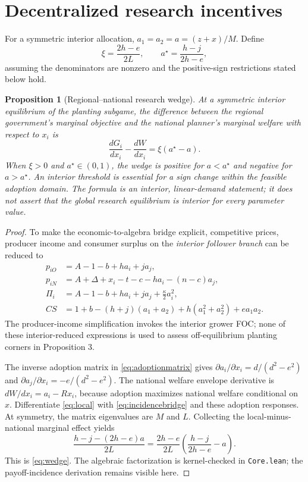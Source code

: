 \documentclass[11pt]{article}
\newtheorem{proposition}{Proposition}
\begin{document}
\section{Decentralized research incentives}
For a symmetric interior allocation, $a_1=a_2=a=(z+x)/M$. Define
\begin{equation}
 \xi=\frac{2h-e}{2L},\qquad a^\star=\frac{h-j}{2h-e},
 \label{eq:threshold}
\end{equation}
assuming the denominators are nonzero and the positive-sign restrictions stated below hold.

\begin{proposition}[Regional--national research wedge]
At a symmetric interior equilibrium of the planting subgame, the difference between the regional government's marginal objective and the national planner's marginal welfare with respect to $x_i$ is
\begin{equation}
 \frac{dG_i}{dx_i}-\frac{dW}{dx_i}=\xi(a^\star-a).
 \label{eq:wedge}
\end{equation}
When $\xi>0$ and $a^\star\in(0,1)$, the wedge is positive for $a<a^\star$ and negative for $a>a^\star$. An interior threshold is essential for a sign change within the feasible adoption domain. The formula is an interior, linear-demand statement; it does not assert that the global research equilibrium is interior for every parameter value.
\end{proposition}
\begin{proof}
To make the economic-to-algebra bridge explicit, competitive prices, producer income and consumer surplus on the \emph{interior follower branch} can be reduced to
\begin{align}
p_{iO}&=A-1-b+h a_i+j a_j,\nonumber\\
p_{iN}&=A+\Delta+x_i-t-c-h a_i-(n-c)a_j,\nonumber\\
\Pi_i&=A-1-b+h a_i+j a_j+\frac{\kappa}{2}a_i^2,\nonumber\\
CS&=1+b-(h+j)(a_1+a_2)
+h(a_1^2+a_2^2)+e a_1a_2.
\label{eq:incidencebridge}
\end{align}
The producer-income simplification invokes the interior grower FOC; none of these interior-reduced expressions is used to assess off-equilibrium planting corners in Proposition 3.

The inverse adoption matrix in \eqref{eq:adoptionmatrix} gives $\partial a_i/\partial x_i=d/(d^2-e^2)$ and $\partial a_j/\partial x_i=-e/(d^2-e^2)$. The national welfare envelope derivative is $dW/dx_i=a_i-Rx_i$, because adoption maximizes national welfare conditional on $x$. Differentiate \eqref{eq:local} with \eqref{eq:incidencebridge} and these adoption responses. At symmetry, the matrix eigenvalues are $M$ and $L$. Collecting the local-minus-national marginal effect yields
\[
 \frac{h-j-(2h-e)a}{2L}
 =\frac{2h-e}{2L}\left(\frac{h-j}{2h-e}-a\right).
\]
This is \eqref{eq:wedge}. The algebraic factorization is kernel-checked in \texttt{Core.lean}; the payoff-incidence derivation remains visible here.
\end{proof}
\end{document}
